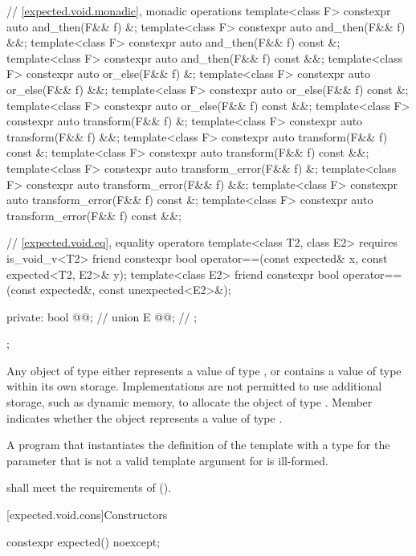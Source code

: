 \begin{codeblock}
{  // \ref{expected.void.monadic}, monadic operations
  template<class F> constexpr auto and_then(F&& f) &;
  template<class F> constexpr auto and_then(F&& f) &&;
  template<class F> constexpr auto and_then(F&& f) const &;
  template<class F> constexpr auto and_then(F&& f) const &&;
  template<class F> constexpr auto or_else(F&& f) &;
  template<class F> constexpr auto or_else(F&& f) &&;
  template<class F> constexpr auto or_else(F&& f) const &;
  template<class F> constexpr auto or_else(F&& f) const &&;
  template<class F> constexpr auto transform(F&& f) &;
  template<class F> constexpr auto transform(F&& f) &&;
  template<class F> constexpr auto transform(F&& f) const &;
  template<class F> constexpr auto transform(F&& f) const &&;
  template<class F> constexpr auto transform_error(F&& f) &;
  template<class F> constexpr auto transform_error(F&& f) &&;
  template<class F> constexpr auto transform_error(F&& f) const &;
  template<class F> constexpr auto transform_error(F&& f) const &&;

  // \ref{expected.void.eq}, equality operators
  template<class T2, class E2> requires is_void_v<T2>
    friend constexpr bool operator==(const expected& x, const expected<T2, E2>& y);
  template<class E2>
    friend constexpr bool operator==(const expected&, const unexpected<E2>&);

private:
  bool @@;         // \expos
  union {
    E @@;             // \expos
  };
};
\end{codeblock}

\pnum
Any object of type  either
represents a value of type , or
contains a value of type  within its own storage.
Implementations are not permitted to use additional storage,
such as dynamic memory, to allocate the object of type .
Member  indicates whether the  object
represents a value of type .

\pnum
A program that instantiates
the definition of the template  with
a type for the  parameter that
is not a valid template argument for  is ill-formed.

\pnum
{} shall meet the requirements of
 ().

[expected.void.cons]{Constructors}

%
\begin{itemdecl}
constexpr expected() noexcept;
\end{itemdecl}

